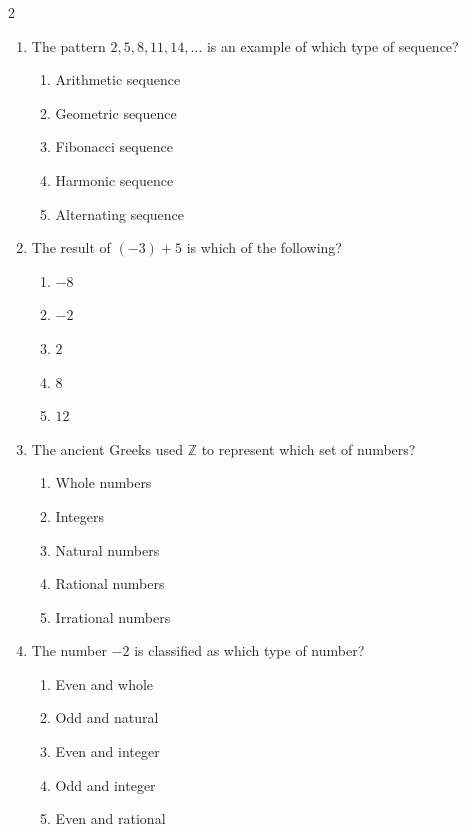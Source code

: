 \documentclass[10pt]{article}
\begin{document}
\begin{multicols}{2}
\begin{enumerate}[label=\textbf{Q\arabic*.}, leftmargin=*, itemsep=6pt, parsep=0pt]
  \item \small The pattern $2, 5, 8, 11, 14, ...$ is an example of which type of sequence?
  \begin{enumerate}[label=(\Alph*), leftmargin=0.6cm, nosep, itemsep=2pt]
    \item Arithmetic sequence
    \item Geometric sequence
    \item Fibonacci sequence
    \item Harmonic sequence
    \item Alternating sequence
  \end{enumerate}

  \item \small The result of $(-3) + 5$ is which of the following?
  \begin{enumerate}[label=(\Alph*), leftmargin=0.6cm, nosep, itemsep=2pt]
    \item $-8$
    \item $-2$
    \item $2$
    \item $8$
    \item $12$
  \end{enumerate}

  \item \small The ancient Greeks used $\mathbb{Z}$ to represent which set of numbers?
  \begin{enumerate}[label=(\Alph*), leftmargin=0.6cm, nosep, itemsep=2pt]
    \item Whole numbers
    \item Integers
    \item Natural numbers
    \item Rational numbers
    \item Irrational numbers
  \end{enumerate}

  \item \small The number $-2$ is classified as which type of number?
  \begin{enumerate}[label=(\Alph*), leftmargin=0.6cm, nosep, itemsep=2pt]
    \item Even and whole
    \item Odd and natural
    \item Even and integer
    \item Odd and integer
    \item Even and rational
  \end{enumerate}


\end{enumerate}
\end{multicols}
\end{document}

